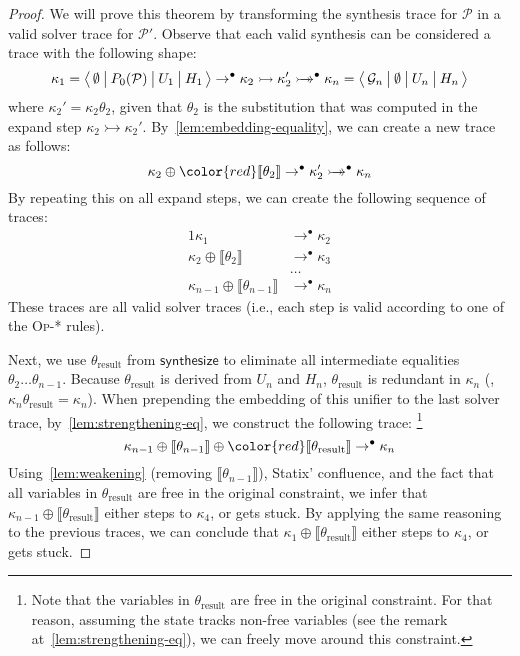 \begin{proof}
    We will prove this theorem by transforming the synthesis trace for $\mathcal{P}$ in a valid solver trace for $\mathcal{P}'$.
    Observe that each valid synthesis can be considered a trace with the following shape:
    \[
        \kappa_1 = \big\langle\, \emptyset\: \big|\: P_0(\mathcal{P})\: \big|\: U_1\: \big|\: H_1\, \big\rangle
        \rightarrow^{\bullet}
        \kappa_2
        \rightarrowtail
        \kappa_2'
        \rightarrowtail\mathrel{\mkern-14mu}\rightarrow^{\bullet}
        \kappa_n = \big\langle\, \mathcal{G}_n\: \big|\: \emptyset\: \big|\: U_n\: \big|\: H_n\, \big\rangle
    \]
    where $\kappa_2' = \kappa_2\theta_2$, given that $\theta_2$ is the substitution that was computed in the expand step $\kappa_2 \rightarrowtail \kappa_2'$.
    By~\cref{lem:embedding-equality}, we can create a new trace as follows:
    \[
        \kappa_2 \oplus {\color{red} \llbracket \theta_2 \rrbracket}
        \rightarrow^{\bullet}
        \kappa_2'
        \twoheadrightarrowtail^{\bullet}
        \kappa_n
    \]
    By repeating this on all expand steps, we can create the following sequence of traces:
    \begin{alignat*}{1}
        \kappa_1 &\rightarrow^{\bullet} \kappa_2 \\
        \kappa_2 \oplus \llbracket \theta_2 \rrbracket &\rightarrow^{\bullet} \kappa_3 \\
        &\ldots \\
        \kappa_{n-1} \oplus \llbracket \theta_{n-1} \rrbracket &\rightarrow^{\bullet} \kappa_n
    \end{alignat*}
    These traces are all valid solver traces (i.e., each step is valid according to one of the \textsc{Op-*} rules).

    Next, we use $\theta_{\text{result}}$ from $\mathsf{synthesize}$ to eliminate all intermediate equalities $\theta_2 \ldots \theta_{n-1}$.
    Because $\theta_{\text{result}}$ is derived from $U_n$ and $H_n$, $\theta_{\text{result}}$ is redundant in $\kappa_n$ (\ie, $\kappa_n \theta_{\text{result}} = \kappa_n$).
    When prepending the embedding of this unifier to the last solver trace, by~\cref{lem:strengthening-eq}, we construct the following trace:%
    \footnote{
        Note that the variables in $\theta_{\text{result}}$ are free in the original constraint.
        For that reason, assuming the state tracks non-free variables (see the remark at~\cref{lem:strengthening-eq}), we can freely move around this constraint.
    }
    \[
        \kappa_{n-1} \oplus \llbracket \theta_{n-1} \rrbracket \oplus
            {{\color{red} \llbracket \theta_{\text{result}} \rrbracket}}
        \rightarrow^{\bullet}
        \kappa_n
    \]
    Using~\cref{lem:weakening} (removing $\llbracket \theta_{n-1} \rrbracket$), Statix' confluence, and the fact that all variables in $\theta_{\text{result}}$ are free in the original constraint, we infer that $\kappa_{n-1} \oplus
    {{\llbracket \theta_{\text{result}} \rrbracket}}$ either steps to $\kappa_4$, or gets stuck.
    By applying the same reasoning to the previous traces, we can conclude that $\kappa_1 \oplus {\llbracket \theta_{\text{result}} \rrbracket}$ either steps to $\kappa_4$, or gets stuck.


\end{proof}
